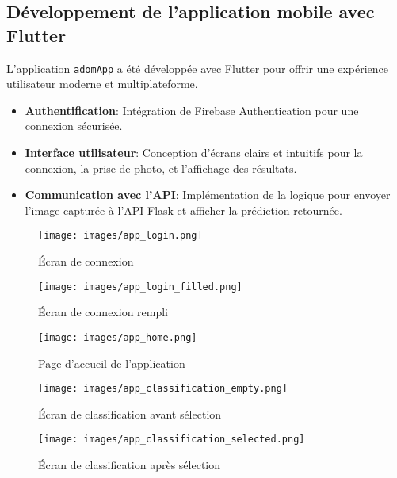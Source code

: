 \documentclass[12pt,a4paper]{report}
\begin{document}
\subsection{Développement de l’application mobile avec Flutter}
L’application \texttt{adomApp} a été développée avec Flutter pour offrir une expérience utilisateur moderne et multiplateforme.
\begin{itemize}
    \item \textbf{Authentification}: Intégration de Firebase Authentication pour une connexion sécurisée.
    \item \textbf{Interface utilisateur}: Conception d’écrans clairs et intuitifs pour la connexion, la prise de photo, et l’affichage des résultats.
    \item \textbf{Communication avec l’API}: Implémentation de la logique pour envoyer l’image capturée à l’API Flask et afficher la prédiction retournée.
\end{itemize}

\begin{figure}[H]
    \centering
    \begin{minipage}{0.45\textwidth}
        \centering
        \texttt{[image: images/app\_login.png]}
        \caption{Écran de connexion}
    \end{minipage}\hfill
    \begin{minipage}{0.45\textwidth}
        \centering
        \texttt{[image: images/app\_login\_filled.png]}
        \caption{Écran de connexion rempli}
    \end{minipage}
\end{figure}

\begin{figure}[H]
    \centering
    \texttt{[image: images/app\_home.png]}
    \caption{Page d’accueil de l’application}
\end{figure}

\begin{figure}[H]
    \centering
    \begin{minipage}{0.45\textwidth}
        \centering
        \texttt{[image: images/app\_classification\_empty.png]}
        \caption{Écran de classification avant sélection}
    \end{minipage}\hfill
    \begin{minipage}{0.45\textwidth}
        \centering
        \texttt{[image: images/app\_classification\_selected.png]}
        \caption{Écran de classification après sélection}
    \end{minipage}
\end{figure}
\end{document}
